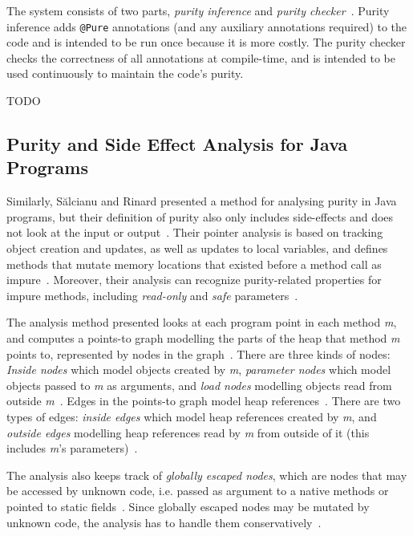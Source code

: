 \documentclass[a4paper,12pt]{article}
\begin{document}
The system consists of two parts, \textit{purity inference} and \textit{purity checker}~\cite{pearce2011jpure}. Purity inference adds \texttt{@Pure} annotations (and any auxiliary annotations required) to the code and is intended to be run once because it is more costly. The purity checker checks the correctness of all annotations at compile-time, and is intended to be used continuously to maintain the code's purity.

TODO

\subsection{Purity and Side Effect Analysis for Java Programs} \label{sub:Purity and Side Effect Analysis for Java Programs}
Similarly, S\u{a}lcianu and Rinard presented a method for analysing purity in Java programs, but their definition of purity also only includes side-effects and does not look at the input or output~\cite{salcianu}. Their pointer analysis is based on tracking object creation and updates, as well as updates to local variables, and defines methods that mutate memory locations that existed before a method call as impure~\cite{salcianu}. Moreover, their analysis can recognize purity-related properties for impure methods, including \textit{read-only} and \textit{safe} parameters~\cite{salcianu}.

The analysis method presented looks at each program point in each method \textit{m}, and computes a points-to graph modelling the parts of the heap that method \textit{m} points to, represented by nodes in the graph~\cite{salcianu}. There are three kinds of nodes: \textit{Inside nodes} which model objects created by \textit{m}, \textit{parameter nodes} which model objects passed to \textit{m} as arguments, and \textit{load nodes} modelling objects read from outside \textit{m}~\cite{salcianu}. Edges in the points-to graph model heap references~\cite{salcianu}. There are two types of edges: \textit{inside edges} which model heap references created by \textit{m}, and \textit{outside edges} modelling heap references read by \textit{m} from outside of it (this includes \textit{m}'s parameters)~\cite{salcianu}.


The analysis also keeps track of \textit{globally escaped nodes}, which are nodes that may be accessed by unknown code, i.e. passed as argument to a native methods or pointed to static fields~\cite{salcianu}. Since globally escaped nodes may be mutated by unknown code, the analysis has to handle them conservatively~\cite{salcianu}.
\end{document}
